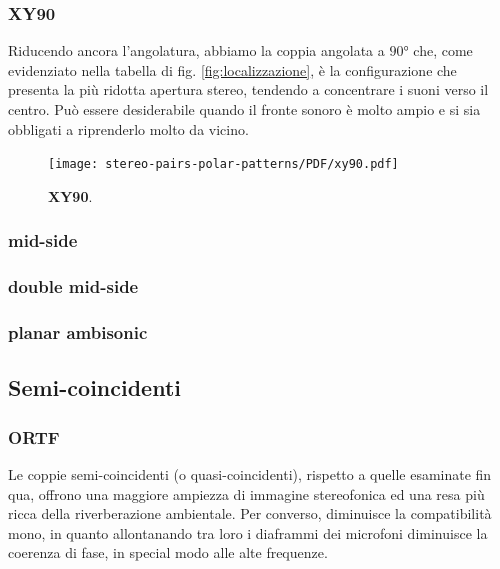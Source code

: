 \subsubsection*{XY90}
Riducendo ancora l’angolatura, abbiamo la coppia angolata a $90°$ che, come
evidenziato nella tabella di fig. \ref{fig:localizzazione}, è la configurazione
che presenta la più ridotta apertura stereo, tendendo a concentrare i suoni
verso il centro. Può essere desiderabile quando il fronte sonoro è molto ampio
e si sia obbligati a riprenderlo molto da vicino.
\begin{figure}[h]
\begin{center}
\texttt{[image: stereo-pairs-polar-patterns/PDF/xy90.pdf]}
\caption{\textbf{XY90}.}
\label{xy90}
\end{center}
\end{figure}
\subsubsection*{mid-side}
\subsubsection*{double mid-side}
\subsubsection*{planar ambisonic}
\subsection*{Semi-coincidenti}
\subsubsection*{ORTF}
Le coppie semi-coincidenti (o quasi-coincidenti), rispetto a quelle esaminate fin qua, offrono una
maggiore ampiezza di immagine stereofonica ed una resa più ricca della riverberazione
ambientale. Per converso, diminuisce la compatibilità mono, in quanto allontanando
tra loro i diaframmi dei microfoni diminuisce la coerenza di fase, in special
modo alle alte frequenze.

